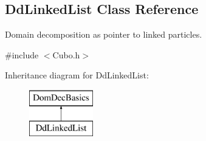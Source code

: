 \hypertarget{classDdLinkedList}{}\subsection{Dd\+Linked\+List Class Reference}
\label{classDdLinkedList}


Domain decomposition as pointer to linked particles.  




{\ttfamily \#include $<$Cubo.\+h$>$}

Inheritance diagram for Dd\+Linked\+List\+:\begin{figure}[H]
\begin{center}
\leavevmode
\includegraphics[height=2.000000cm]{classDdLinkedList}
\end{center}
\end{figure}

